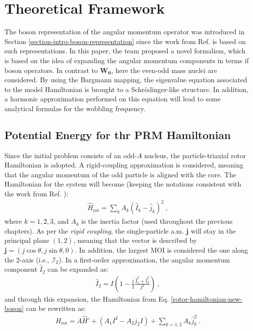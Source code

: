 \section{Theoretical Framework}
\label{section-new-boson-theoretical-framework}

The boson representation of the angular momentum operator was introduced in Section \ref{section-intro-boson-representation} since the work from Ref. \cite{raduta2020new} is based on such representations. In this paper, the team proposed a novel formalism, which is based on the idea of expanding the angular momentum components in terms if boson operators. In contrast to $\mathbf{W_0}$, here the even-odd mass nuclei are considered. By using the Bargmann mapping, the eigenvalue equation associated to the model Hamiltonian is brought to a Schrödinger-like structure. In addition, a harmonic approximation performed on this equation will lead to some analytical formulas for the wobbling frequency.

\subsection{Potential Energy for thr PRM Hamiltonian}

Since the initial problem consists of an odd-$A$ nucleus, the particle-triaxial rotor Hamiltonian is adopted. A rigid-coupling approximation is considered, meaning that the angular momentum of the odd particle is aligned with the core. The Hamiltonian for the system will become (keeping the notations consistent with the work from Ref. \cite{raduta2020new}):
\begin{align}
    \hat{H}_\text{rot}=\sum_{k}A_k\left(\hat{I}_k-\hat{j}_k\right)^2\ ,
    \label{rotor-hamiltonian-new-boson}
\end{align}
where $k=1,2,3$, and $A_k$ is the inertia factor (used throughout the previous chapters). As per the \emph{rigid coupling}, the single-particle a.m. $\mathbf{j}$ will stay in the principal plane $(1,2)$, meaning that the vector is described by $\mathbf{j}=\left(j\cos\theta,j\sin\theta,0\right)$. In addition, the largest MOI is considered the one along the 2-axis (i.e., $\mathcal{I}_2$). In a first-order approximation, the angular momentum component $\hat{I}_2$ can be expanded as:
\begin{align}
    \hat{I}_2=I\left(1-\frac{1}{2}\frac{\hat{I}_1^2+\hat{I}_3^2}{I^2}\right)\ ,
\end{align}
and through this expansion, the Hamiltonian from Eq. \ref{rotor-hamiltonian-new-boson} can be rewritten as:
\begin{align}
    \hat{H}_\text{rot}=A\hat{H}'+\left(A_1I^2-A_2j_2I\right)+\sum_{k=1,2}A_k\hat{j}_k^2\ .
    \label{rewritten-rotor-hamiltonian-new-boson}
\end{align}

